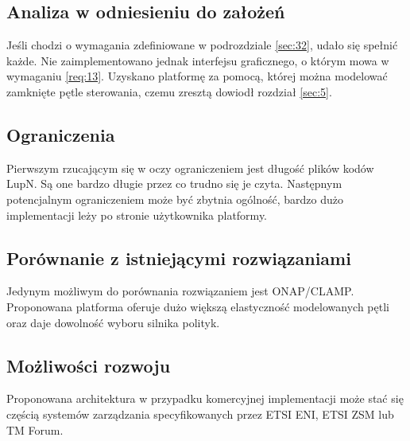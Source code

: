 \subsection{Analiza w odniesieniu do założeń} 

Jeśli chodzi o wymagania zdefiniowane w podrozdziale \ref{sec:32}, udało się spełnić każde. Nie zaimplementowano jednak interfejsu graficznego, o którym mowa w wymaganiu \ref{req:13}. Uzyskano platformę za pomocą, której można modelować zamknięte pętle sterowania, czemu zresztą dowiodł rozdział \ref{sec:5}. 

\subsection{Ograniczenia}

Pierwszym rzucającym się w oczy ograniczeniem jest długość plików kodów LupN. Są one bardzo długie przez co trudno się je czyta. Następnym potencjalnym ograniczeniem może być zbytnia ogólność, bardzo dużo implementacji leży po stronie użytkownika platformy.

\subsection{Porównanie z istniejącymi rozwiązaniami}

Jedynym możliwym do porównania rozwiązaniem jest ONAP/CLAMP. Proponowana platforma oferuje dużo większą elastyczność modelowanych pętli oraz daje dowolność wyboru silnika polityk.

\subsection{Możliwości rozwoju}

Proponowana architektura w przypadku komercyjnej implementacji może stać się częścią systemów zarządzania specyfikowanych przez ETSI ENI, ETSI ZSM lub TM Forum. 

